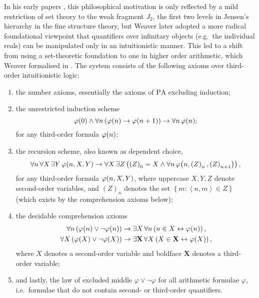\documentclass[11pt]{article}
\theoremstyle{plain}
\theoremstyle{definition}
\newcommand{\tuple}[1]{\left\langle #1 \right\rangle}
\begin{document}
In his early papers \cites{weaver05-conceptualism,weaver05-j2}, this philosophical motivation is only reflected by a mild restriction of set theory to the weak fragment $J_2$, the first two levels in Jensen's hierarchy in the fine structure theory, but Weaver later adopted a more radical foundational viewpoint that quantifiers over infinitary objects (e.g.\ the individual reals) can be manipulated only in an intuitionistic manner. This led to a shift from using a set-theoretic foundation to one in higher order arithmetic, which Weaver formalised in \cite{weaver09-cm}. The system consists of the following axioms over third-order intuitionistic logic:
\begin{enumerate}[label=$\left(\arabic*\right)$]
    \item the number axioms, essentially the axioms of $\mathrm{PA}$ excluding induction;
    \item the unrestricted induction scheme
          \[\varphi\mleft(0\mright) \land \forall n \left(\varphi\mleft(n\mright) \rightarrow \varphi\mleft(n + 1\mright)\right) \rightarrow \forall n \, \varphi\mleft(n\mright);\]
          for any third-order formula $\varphi\mleft(n\mright)$;
    \item the recursion scheme, also known as dependent choice,
          \[\forall n \, \forall X \, \exists Y \, \varphi\mleft(n, X, Y\mright) \rightarrow \forall X \, \exists Z \left(\left(Z\right)_0 = X \land \forall n \, \varphi\mleft(n, \left(Z\right)_n, \left(Z\right)_{n + 1}\mright)\right),\]
          for any third-order formula $\varphi\mleft(n, X, Y\mright)$, where uppercase $X, Y, Z$ denote second-order variables, and $\left(Z\right)_n$ denotes the set $\left\{m : \tuple{n, m} \in Z\right\}$ (which exists by the comprehension axioms below);
    \item the decidable comprehension axioms
          \begin{align*}
              \forall n \left(\varphi\mleft(n\mright) \lor \neg \varphi\mleft(n\mright)\right) & \rightarrow \exists X \, \forall n \left(n \in X \leftrightarrow \varphi\mleft(n\mright)\right),                   \\
              \forall X \left(\varphi\mleft(X\mright) \lor \neg \varphi\mleft(X\mright)\right) & \rightarrow \exists \mathbf{X} \, \forall X \left(X \in \mathbf{X} \leftrightarrow \varphi\mleft(X\mright)\right),
          \end{align*}
          where $X$ denotes a second-order variable and boldface $\mathbf{X}$ denotes a third-order variable;
    \item and lastly, the law of excluded middle $\varphi \lor \neg \varphi$ for all arithmetic formulae $\varphi$, i.e.\ formulae that do not contain second- or third-order quantifiers.
\end{enumerate}
\end{document}
